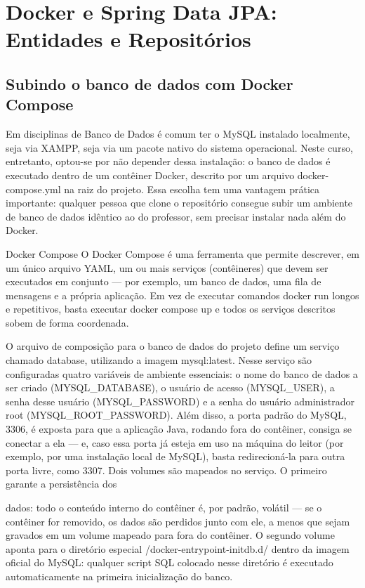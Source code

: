 \chapter{Docker e Spring Data JPA: Entidades e Repositórios}

\section{Subindo o banco de dados com Docker Compose}

Em disciplinas de Banco de Dados é comum ter o MySQL instalado localmente, seja via XAMPP, seja via um pacote nativo do sistema operacional. Neste curso, entretanto, optou-se por não depender dessa instalação: o banco de dados é executado dentro de um contêiner Docker, descrito por um arquivo docker-compose.yml na raiz do projeto. Essa escolha tem uma vantagem prática importante: qualquer pessoa que clone o repositório consegue subir um ambiente de banco de dados idêntico ao do professor, sem precisar instalar nada além do Docker.

Docker Compose O Docker Compose é uma ferramenta que permite descrever, em um único arquivo YAML, um ou mais serviços (contêineres) que devem ser executados em conjunto — por exemplo, um banco de dados, uma fila de mensagens e a própria aplicação. Em vez de executar comandos docker run longos e repetitivos, basta executar docker compose up e todos os serviços descritos sobem de forma coordenada.

O arquivo de composição para o banco de dados do projeto define um serviço chamado database, utilizando a imagem mysql:latest. Nesse serviço são configuradas quatro variáveis de ambiente essenciais: o nome do banco de dados a ser criado (MYSQL\_DATABASE), o usuário de acesso (MYSQL\_USER), a senha desse usuário (MYSQL\_PASSWORD) e a senha do usuário administrador root (MYSQL\_ROOT\_PASSWORD). Além disso, a porta padrão do MySQL, 3306, é exposta para que a aplicação Java, rodando fora do contêiner, consiga se conectar a ela — e, caso essa porta já esteja em uso na máquina do leitor (por exemplo, por uma instalação local de MySQL), basta redirecioná-la para outra porta livre, como 3307. Dois volumes são mapeados no serviço. O primeiro garante a persistência dos

dados: todo o conteúdo interno do contêiner é, por padrão, volátil — se o contêiner for removido, os dados são perdidos junto com ele, a menos que sejam gravados em um volume mapeado para fora do contêiner. O segundo volume aponta para o diretório especial /docker-entrypoint-initdb.d/ dentro da imagem oficial do MySQL: qualquer script SQL colocado nesse diretório é executado automaticamente na primeira inicialização do banco.

